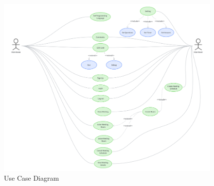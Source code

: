 \documentclass{article}
\begin{document}
   \begin{figure}[H]
    \centering
    \includegraphics[scale=0.065]{diagrams/use-case-diagram.png}
    \caption{Use Case Diagram}
\end{figure}
\newpage
\end{document}
